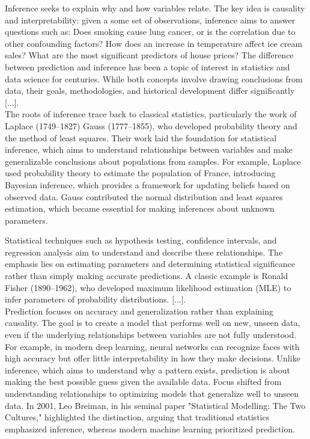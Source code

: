 \documentclass{book}
\begin{document}
Inference seeks to explain why and how variables relate. The key idea is causality and interpretability: given a some set of observations, inference aims to answer questions such as: Does smoking cause lung cancer, or is the correlation due to other confounding factors? How does an increase in temperature affect ice cream sales? What are the most significant predictors of house prices? The difference between prediction and inference has been a topic of interest in statistics and data science for centuries. While both concepts involve drawing conclusions from data, their goals, methodologies, and historical development differ significantly [...].\\

The roots of inference trace back to classical statistics, particularly the work of Laplace (1749–1827) Gauss (1777–1855), who developed probability theory and the method of least squares. Their work laid the foundation for statistical inference, which aims to understand relationships between variables and make generalizable conclusions about populations from samples. For example, Laplace used probability theory to estimate the population of France, introducing Bayesian inference, which provides a framework for updating beliefs based on observed data. Gauss contributed the normal distribution and least squares estimation, which became essential for making inferences about unknown parameters.

Statistical techniques such as hypothesis testing, confidence intervals, and regression analysis aim to understand and describe these relationships. The emphasis lies on estimating parameters and determining statistical significance rather than simply making accurate predictions. A classic example is Ronald Fisher (1890–1962), who developed maximum likelihood estimation (MLE) to infer parameters of probability distributions. [...].\\

Prediction focuses on accuracy and generalization rather than explaining causality. The goal is to create a model that performs well on new, unseen data, even if the underlying relationships between variables are not fully understood. For example, in modern deep learning, neural networks can recognize faces with high accuracy but offer little interpretability in how they make decisions. Unlike inference, which aims to understand why a pattern exists, prediction is about making the best possible guess given the available data. Focus shifted from understanding relationships to optimizing models that generalize well to unseen data. In 2001, Leo Breiman, in his seminal paper "Statistical Modelling: The Two Cultures," highlighted the distinction, arguing that traditional statistics emphasized inference, whereas modern machine learning prioritized prediction.\\
\end{document}
